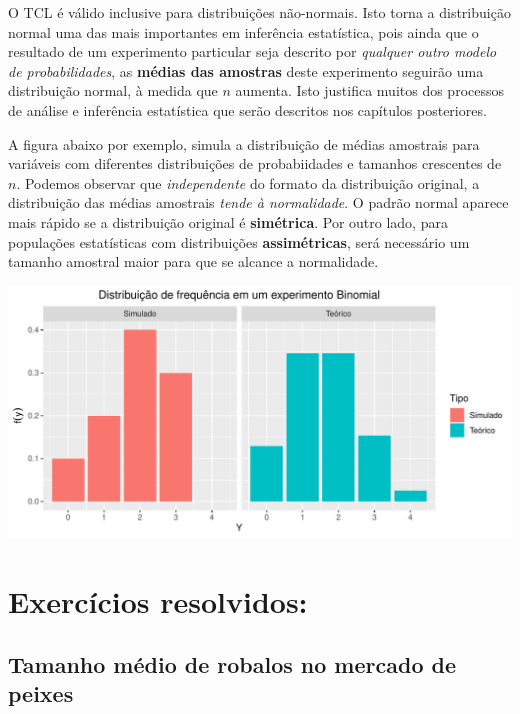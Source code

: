 \documentclass[
]{book}
\begin{document}
O TCL é válido inclusive para distribuições não-normais. Isto torna a distribuição normal uma das mais importantes em inferência estatística, pois ainda que o resultado de um experimento particular seja descrito por \emph{qualquer outro modelo de probabilidades}, as \textbf{médias das amostras} deste experimento seguirão uma distribuição normal, à medida que \(n\) aumenta. Isto justifica muitos dos processos de análise e inferência estatística que serão descritos nos capítulos posteriores.

A figura abaixo por exemplo, simula a distribuição de médias amostrais para variáveis com diferentes distribuições de probabiidades e tamanhos crescentes de \(n\). Podemos observar que \emph{independente} do formato da distribuição original, a distribuição das médias amostrais \emph{tende à normalidade}. O padrão normal aparece mais rápido se a distribuição original é \textbf{simétrica}. Por outro lado, para populações estatísticas com distribuições \textbf{assimétricas}, será necessário um tamanho amostral maior para que se alcance a normalidade.

\includegraphics{probest-cambientais_files/figure-latex/unnamed-chunk-229-1.pdf}

\hypertarget{exercuxedcios-resolvidos-1}{%
\section{Exercícios resolvidos:}\label{exercuxedcios-resolvidos-1}}

\hypertarget{tamanho-muxe9dio-de-robalos-no-mercado-de-peixes}{%
\subsection{Tamanho médio de robalos no mercado de peixes}\label{tamanho-muxe9dio-de-robalos-no-mercado-de-peixes}}
\end{document}
